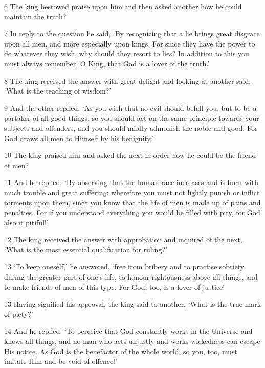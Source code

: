 \par 6 The king bestowed praise upon him and then asked another how he could maintain the truth?

\par 7 In reply to the question he said, ‘By recognizing that a lie brings great disgrace upon all men, and more especially upon kings. For since they have the power to do whatever they wish, why should they resort to lies? In addition to this you must always remember, O King, that God is a lover of the truth.’

\par 8 The king received the answer with great delight and looking at another said, ‘What is the teaching of wisdom?’

\par 9 And the other replied, ‘As you wish that no evil should befall you, but to be a partaker of all good things, so you should act on the same principle towards your subjects and offenders, and you should mildly admonish the noble and good. For God draws all men to Himself by his benignity.’

\par 10 The king praised him and asked the next in order how he could be the friend of men?

\par 11 And he replied, ‘By observing that the human race increases and is born with much trouble and great suffering: wherefore you must not lightly punish or inflict torments upon them, since you know that the life of men is made up of pains and penalties. For if you understood everything you would be filled with pity, for God also it pitiful!’

\par 12 The king received the answer with approbation and inquired of the next, ‘What is the most essential qualification for ruling?’

\par 13 ‘To keep oneself,’ he answered, ‘free from bribery and to practise sobriety during the greater part of one’s life, to honour rightousness above all things, and to make friends of men of this type. For God, too, is a lover of justice!

\par 13 Having signified his approval, the king said to another, ‘What is the true mark of piety?’

\par 14 And he replied, ‘To perceive that God constantly works in the Universe and knows all things, and no man who acts unjustly and works wickedness can escape His notice. As God is the benefactor of the whole world, so you, too, must imitate Him and be void of offence!’

